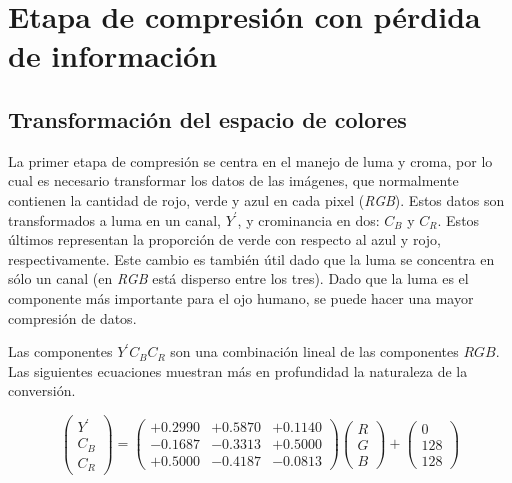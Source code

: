 \documentclass[%
final,
%
reprint,
%
notitlepage,
narroweqnarray,
inline,
twoside,
invited
]{ieee}
\begin{document}

\section{Etapa de compresión con pérdida de información}

\subsection{Transformación del espacio de colores}

\par La primer etapa de compresión se centra en el manejo de luma y croma, por lo cual es necesario transformar 
los datos de las imágenes, que normalmente contienen la cantidad de rojo, verde y azul en cada pixel (\textit{RGB}). 
Estos datos son transformados a luma en un canal, $Y^{'}$, y crominancia en dos: $C_B$ y $C_R$. Estos últimos 
 representan la proporción de verde con respecto al azul y rojo, respectivamente. 
 Este cambio es también útil dado que la luma se concentra 
en sólo un canal (en \textit{RGB} está disperso entre los tres). Dado que la luma es el componente más 
importante para el ojo humano, se puede hacer una mayor compresión de datos.

\par Las componentes $Y^{'}C_BC_R$ son una combinación lineal de las componentes $RGB$. Las siguientes ecuaciones 
 muestran más en profundidad la naturaleza de la conversión.

\[
 \begin{pmatrix} Y^{'} \\ C_B \\ C_R \end{pmatrix} = \begin{pmatrix} +0.2990 & +0.5870 & +0.1140 \\
-0.1687 & -0.3313 & +0.5000 \\
+0.5000 & -0.4187 & -0.0813  \end{pmatrix} \begin{pmatrix}R \\ G \\ B\end{pmatrix} + \begin{pmatrix}0 \\ 128 \\ 128\end{pmatrix}
\]
\end{document}
